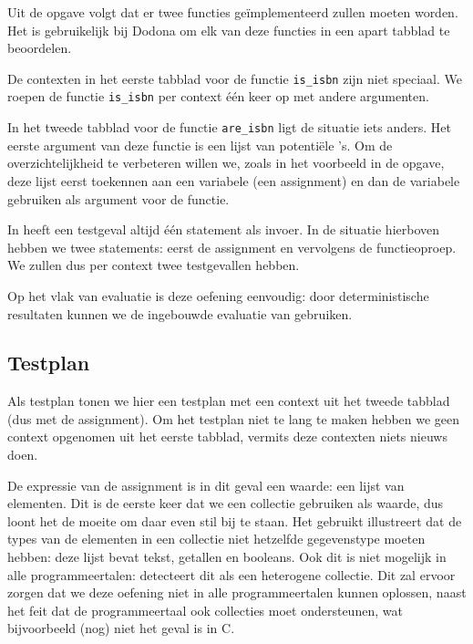 Uit de opgave volgt dat er twee functies geïmplementeerd zullen moeten worden.
Het is gebruikelijk bij Dodona om elk van deze functies in een apart tabblad te beoordelen.

De contexten in het eerste tabblad voor de functie \texttt{is\_isbn} zijn niet speciaal.
We roepen de functie \texttt{is\_isbn} per context één keer op met andere argumenten.

In het tweede tabblad voor de functie \texttt{are\_isbn} ligt de situatie iets anders.
Het eerste argument van deze functie is een lijst van potentiële 's.
Om de overzichtelijkheid te verbeteren willen we, zoals in het voorbeeld in de opgave, deze lijst eerst toekennen aan een variabele (een assignment) en dan de variabele gebruiken als argument voor de functie.

In \tested{} heeft een testgeval altijd één statement als invoer.
In de situatie hierboven hebben we twee statements: eerst de assignment en vervolgens de functieoproep.
We zullen dus per context twee testgevallen hebben.

Op het vlak van evaluatie is deze oefening eenvoudig: door deterministische resultaten kunnen we de ingebouwde evaluatie van \tested{} gebruiken.

\subsection{Testplan}\label{subsec:oefening-isbn-testplan}

Als testplan tonen we hier een testplan met een context uit het tweede tabblad (dus met de assignment).
Om het testplan niet te lang te maken hebben we geen context opgenomen uit het eerste tabblad, vermits deze contexten niets nieuws doen.

De expressie van de assignment is in dit geval een waarde: een lijst van elementen.
Dit is de eerste keer dat we een collectie gebruiken als waarde, dus loont het de moeite om daar even stil bij te staan.
Het gebruikt illustreert dat de types van de elementen in een collectie niet hetzelfde gegevenstype moeten hebben: deze lijst bevat tekst, getallen en booleans.
Ook dit is niet mogelijk in alle programmeertalen: \tested{} detecteert dit als een heterogene collectie.
Dit zal ervoor zorgen dat we deze oefening niet in alle programmeertalen kunnen oplossen, naast het feit dat de programmeertaal ook collecties moet ondersteunen, wat bijvoorbeeld (nog) niet het geval is in C\@.

\inputminted{json}{sources/isbn-plan.tson}
